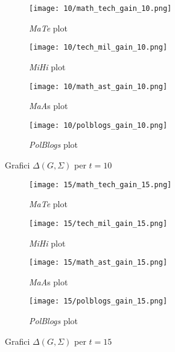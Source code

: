 \begin{figure}[!h]
    \centering
\begin{subfigure}[b]{0.4\textwidth}
    \centering
    \texttt{[image: 10/math\_tech\_gain\_10.png]}
    \caption{\emph{MaTe} plot}\label{fig:mate_g_10}
\end{subfigure}
\hspace{0.1\columnwidth}
\begin{subfigure}[b]{0.4\textwidth}
    \centering
    \texttt{[image: 10/tech\_mil\_gain\_10.png]}
    \caption{\emph{MiHi} plot}\label{fig:mihi_g_10}
\end{subfigure}

\begin{subfigure}[b]{0.4\textwidth}
    \centering
    \texttt{[image: 10/math\_ast\_gain\_10.png]}
    \caption{\emph{MaA}s plot}\label{fig:maas_g_10}
\end{subfigure}
\hspace{0.1\columnwidth}
\begin{subfigure}[b]{0.4\textwidth}
    \centering
    \texttt{[image: 10/polblogs\_gain\_10.png]}
    \caption{\emph{PolBlogs} plot}\label{fig:polblogs_g_10}
\end{subfigure}
\caption{Grafici $\Delta(G,\Sigma)$ per $t=10$}
\end{figure}
\newpage
\begin{figure}[!h]
    \centering
\begin{subfigure}[b]{0.4\textwidth}
    \centering
    \texttt{[image: 15/math\_tech\_gain\_15.png]}
    \caption{\emph{MaTe} plot}\label{fig:mate_g_15}
\end{subfigure}
\hspace{0.1\columnwidth}
\begin{subfigure}[b]{0.4\textwidth}
    \centering
    \texttt{[image: 15/tech\_mil\_gain\_15.png]}
    \caption{\emph{MiHi} plot}\label{fig:mihi_g_15}
\end{subfigure}

\begin{subfigure}[b]{0.4\textwidth}
    \centering
    \texttt{[image: 15/math\_ast\_gain\_15.png]}
    \caption{\emph{MaA}s plot}\label{fig:maas_g_15}
\end{subfigure}
\hspace{0.1\columnwidth}
\begin{subfigure}[b]{0.4\textwidth}
    \centering
    \texttt{[image: 15/polblogs\_gain\_15.png]}
    \caption{\emph{PolBlogs} plot}\label{fig:polblogs_g_15}
\end{subfigure}
\caption{Grafici $\Delta(G,\Sigma)$ per $t=15$}
\end{figure}

